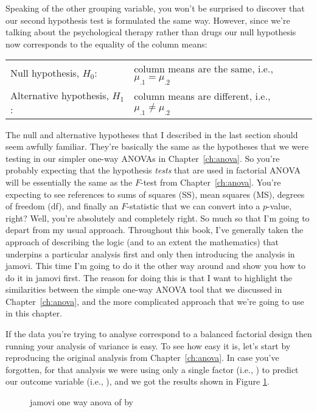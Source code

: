 Speaking of the other grouping variable, you won't be surprised to discover that our second hypothesis test is formulated the same way. However, since we're talking about the psychological therapy rather than drugs our null hypothesis now corresponds to the equality of the column means:
\begin{center}
\begin{tabular}{ll}
Null hypothesis, $H_0$: & column means are the same, i.e., $\mu_{.1} = \mu_{.2}$ \\
Alternative hypothesis, $H_1$: & column means are different, i.e., $\mu_{.1} \neq \mu_{.2}$
\end{tabular}
\end{center}


The null and alternative hypotheses that I described in the last section should seem awfully familiar. They're basically the same as the hypotheses that we were testing in our simpler one-way ANOVAs in Chapter~\ref{ch:anova}. So you're probably expecting that the hypothesis {\it tests} that are used in factorial ANOVA will be essentially the same as the $F$-test from Chapter~\ref{ch:anova}. You're expecting to see references to sums of squares (SS), mean squares (MS), degrees of freedom (df), and finally an $F$-statistic that we can convert into a $p$-value, right? Well, you're absolutely and completely right. So much so that I'm going to depart from my usual approach. Throughout this book, I've generally taken the approach of describing the logic (and to an extent the mathematics) that underpins a particular analysis first and only then introducing the analysis in jamovi. This time I'm going to do it the other way around and show you how to do it in jamovi first. The reason for doing this is that I want to highlight the similarities between the simple one-way ANOVA tool that we discussed in Chapter~\ref{ch:anova}, and the more complicated approach that we're going to use in this chapter. 

If the data you're trying to analyse correspond to a balanced factorial design then running your analysis of variance is easy. To see how easy it is, let's start by reproducing the original analysis from Chapter~\ref{ch:anova}. In case you've forgotten, for that analysis we were using only a single factor (i.e., ) to predict our outcome variable (i.e., ), and we got the results shown in Figure \ref{fig:factorialanova2}.

\begin{figure}[!htb]
\begin{center}
\caption{jamovi one way anova of  by }
\label{fig:factorialanova2}
\HR
\end{center}
\end{figure}

